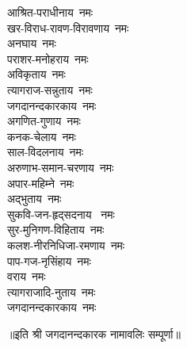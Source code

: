 \begin{flushleft}
\begin{multicols}{2}
आश्रित-पराधीनाय~नमः\\
खर-विराध-रावण-विरावणाय~नमः\\
अनघाय~नमः\\
पराशर-मनोहराय~नमः\\
अविकृताय~नमः\\
त्यागराज-सन्नुताय~नमः\\
जगदानन्दकारकाय~नमः\\
अगणित-गुणाय~नमः\\
कनक-चेलाय~नमः\\
साल-विदलनाय~नमः\hfill{}\\
अरुणाभ-समान-चरणाय~नमः\\
अपार-महिम्ने~नमः\\
अद्भुताय~नमः\\
सुकवि-जन-हृद्सदनाय ~नमः\\
सुर-मुनिगण-विहिताय~नमः\\
कलश-नीरनिधिजा-रमणाय~नमः\\
पाप-गज-नृसिंहाय~नमः\\
वराय~नमः\\
त्यागराजादि-नुताय~नमः\\
जगदानन्दकारकाय~नमः\hfill{}\\
\end{multicols}
\end{flushleft}
॥इति श्री जगदानन्दकारक नामावलिः सम्पूर्णा॥
